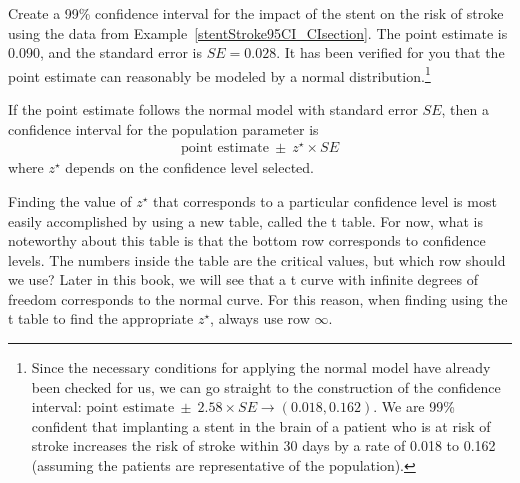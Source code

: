 \begin{exercise} \label{find99CIForRun10AgeExercise}
Create a 99\% confidence interval for the impact of the stent on the risk of stroke using the data from Example~\ref{stentStroke95CI_CIsection}. The point estimate is 0.090, and the standard error is $SE = 0.028$. It has been verified for you that the point estimate can reasonably be modeled by a normal distribution.\footnote{Since the necessary conditions for applying the normal model have already been checked for us, we can go straight to the construction of the confidence interval: $\text{point estimate}\ \pm\ 2.58 \times SE \rightarrow (0.018, 0.162)$. We are 99\% confident that implanting a stent in the brain of a patient who is at risk of stroke increases the risk of stroke within 30 days by a rate of 0.018 to 0.162 (assuming the patients are representative of the population).}
\end{exercise}

\begin{termBox}{
If the point estimate follows the normal model with standard error $SE$, then a confidence interval for the population parameter is
\begin{eqnarray*}
\text{point estimate}\ \pm\ z^{\star} \times SE
\end{eqnarray*}
where $z^{\star}$ depends on the confidence level selected.}
\end{termBox}

Finding the value of $z^{\star}$ that corresponds to a particular confidence level is most easily accomplished by using a new table, called the t table. For now, what is noteworthy about this table is that the bottom row corresponds to confidence levels. The numbers inside the table are the critical values, but which row should we use? Later in this book, we will see that a t curve with infinite degrees of freedom corresponds to the normal curve. For this reason, when finding using the t table to find the appropriate $z^{\star}$, always use row $\infty$.

